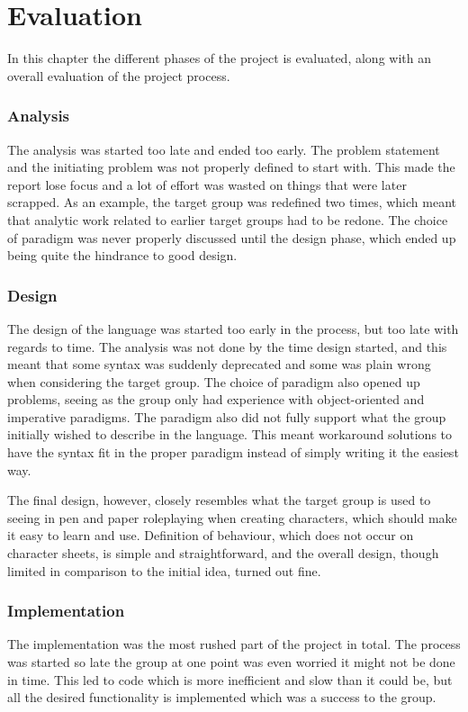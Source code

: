 \chapter{Evaluation}
In this chapter the different phases of the project is evaluated, along with an overall evaluation of the project process.

\subsection{Analysis}
The analysis was started too late and ended too early. The problem statement and the initiating problem was not properly defined to start with. This made the report lose focus and a lot of effort was wasted on things that were later scrapped. As an example, the target group was redefined two times, which meant that analytic work related to earlier target groups had to be redone.
The choice of paradigm was never properly discussed until the design phase, which ended up being quite the hindrance to good design.

\subsection{Design}
The design of the language was started too early in the process, but too late with regards to time. The analysis was not done by the time design started, and this meant that some syntax was suddenly deprecated and some was plain wrong when considering the target group. The choice of paradigm also opened up problems, seeing as the group only had experience with object-oriented and imperative paradigms. The paradigm also did not fully support what the group initially wished to describe in the language. This meant workaround solutions to have the syntax fit in the proper paradigm instead of simply writing it the easiest way.

The final design, however, closely resembles what the target group is used to seeing in pen and paper roleplaying when creating characters, which should make it easy to learn and use. Definition of behaviour, which does not occur on character sheets, is simple and straightforward, and the overall design, though limited in comparison to the initial idea, turned out fine.

\subsection{Implementation}
The implementation was the most rushed part of the project in total. The process was started so late the group at one point was even worried it might not be done in time. This led to code which is more inefficient and slow than it could be, but all the desired functionality is implemented which was a success to the group.

